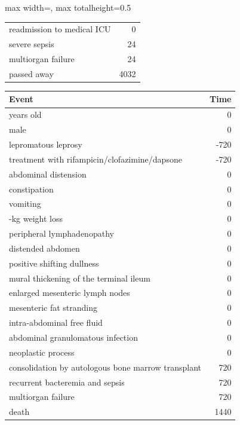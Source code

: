 \begin{ChSixUncaptionedFigure}
\begin{ChSixFloatBody}
\begin{adjustbox}{max width=\linewidth, max totalheight=0.5\textheight}
\begin{tcolorbox}
\begin{minipage}[t]{0.49\textwidth}
\begin{tcolorbox}[ChSix/annobox,title={DeepSeek-R1-IQ1 annotation}]
\begin{tabular}{>{\raggedright\arraybackslash}p{} r}
readmission to medical ICU & 0 \\
severe sepsis & 24 \\
multiorgan failure & 24 \\
passed away & 4032 \\
\bottomrule
\end{tabular}
\end{tcolorbox}
\end{minipage}
\hfill
\begin{minipage}[t]{0.49\textwidth}\vspace{0pt}
\begin{tcolorbox}[ChSix/annobox,title={Llama-3.3-70B-Instruct annotation}]
\ChSixAnnotationTableStyle
\begin{tabular}{>{\raggedright\arraybackslash}p{} r}
\toprule
\textbf{Event} & \textbf{Time} \\
\midrule
57 years old & 0 \\
male & 0 \\
lepromatous leprosy & -720 \\
treatment with rifampicin/clofazimine/dapsone & -720 \\
abdominal distension & 0 \\
constipation & 0 \\
vomiting & 0 \\
10-kg weight loss & 0 \\
peripheral lymphadenopathy & 0 \\
distended abdomen & 0 \\
positive shifting dullness & 0 \\
mural thickening of the terminal ileum & 0 \\
enlarged mesenteric lymph nodes & 0 \\
mesenteric fat stranding & 0 \\
intra-abdominal free fluid & 0 \\
abdominal granulomatous infection & 0 \\
neoplastic process & 0 \\
consolidation by autologous bone marrow transplant & 720 \\
recurrent bacteremia and sepsis & 720 \\
multiorgan failure & 720 \\
death & 1440 \\
\bottomrule
\end{tabular}
\end{tcolorbox}
\end{minipage}

\end{tcolorbox}
\end{adjustbox}

\end{ChSixFloatBody}
\end{ChSixUncaptionedFigure}